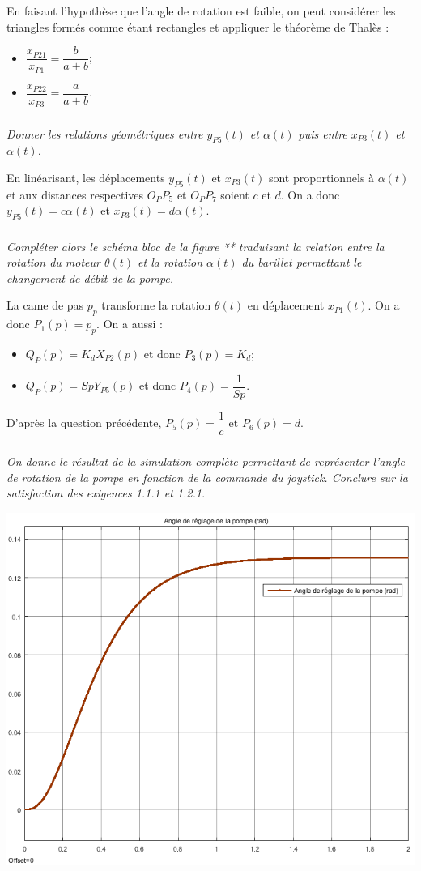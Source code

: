 \documentclass[10pt,fleqn]{article} %
\begin{document}
\begin{multicols}{2}
\begin{corrige}
En faisant l'hypothèse que l'angle de rotation est faible, on peut considérer les triangles formés comme étant rectangles et appliquer le théorème de Thalès :
\begin{itemize}
\item $\dfrac{x_{P21}}{x_{P1}}=\dfrac{b}{a+b}$;
\item $\dfrac{x_{P22}}{x_{P3}}=\dfrac{a}{a+b}$.
\end{itemize}
\end{corrige}

\subparagraph{}
\textit{Donner les relations géométriques entre $y_{P5}(t)$ et $\alpha(t)$ puis entre $x_{P3}(t)$ et $\alpha(t)$.}

\begin{corrige}
En linéarisant, les déplacements $y_{P5}(t)$ et $x_{P3}(t)$ sont proportionnels à $\alpha(t)$ et aux distances respectives $O_PP_5$ et $O_PP_7$ soient $c$ et $d$. 
On a donc $y_{P5}(t)=c\alpha(t)$ et $x_{P3}(t)=d \alpha(t)$.

\end{corrige}

\subparagraph{}
\textit{Compléter alors le schéma bloc de la figure ** traduisant la relation entre la rotation du moteur $\theta(t)$ et la rotation $\alpha(t)$ du barillet permettant le changement de débit de la pompe.}
\begin{corrige}
La came de pas $p_p$ transforme la rotation $\theta(t)$ en déplacement $x_{P1}(t)$. 
On a donc $P_1(p)=p_p$.
On a aussi :
\begin{itemize}
\item $Q_P(p) = K_d X_{P2}(p)$ et donc $P_3(p)=K_d$;
\item $Q_{P}(p) = Sp Y_{P5}(p)$ et donc $P_4(p)=\dfrac{1}{Sp}$.
\end{itemize}
D'après la question précédente, $P_5(p)=\dfrac{1}{c}$ et $P_6(p)=d$.
\end{corrige}


\subparagraph{}
\textit{On donne le résultat de la simulation complète permettant de représenter l'angle de rotation de la pompe en fonction de la commande du joystick. Conclure sur la satisfaction des exigences 1.1.1 et 1.2.1.}

\begin{center}
\includegraphics[width=.45\textwidth]{images/simu_2}
\end{center}


\end{multicols}
\end{document}

